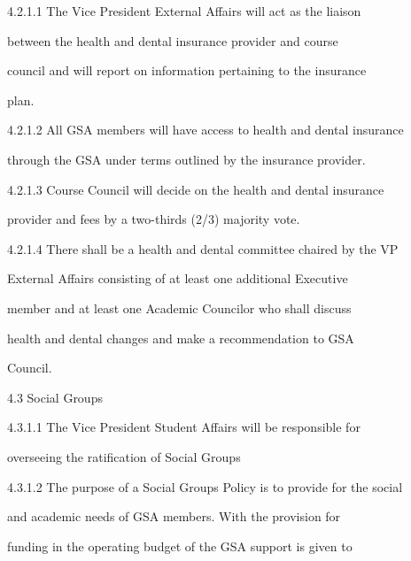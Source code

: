   4.2.1.1      The   Vice   President   External   Affairs   will   act   as   the   liaison  

               between  the  health  and  dental  insurance  provider  and  course  

               council and will report on information pertaining to the insurance  

               plan.   



  4.2.1.2      All GSA members will have access to health and dental insurance  

               through the GSA under terms outlined by the insurance provider.   



  4.2.1.3      Course  Council  will  decide  on  the  health  and  dental  insurance  

               provider and fees by a two-thirds (2/3) majority vote.   



  4.2.1.4      There shall be a health and dental committee chaired by the VP  

               External  Affairs  consisting  of  at  least  one  additional  Executive  

               member and at least one Academic Councilor who shall discuss  

               health  and  dental  changes  and  make  a  recommendation  to  GSA  

               Council.   



  



                                   4.3     Social Groups  



  



  4.3.1.1      The   Vice   President   Student   Affairs   will   be   responsible   for  

               overseeing the ratification of Social Groups  



  4.3.1.2      The purpose of a Social Groups Policy is to provide for the social  

               and  academic  needs  of  GSA  members.  With  the  provision  for  

               funding  in the  operating  budget  of  the  GSA  support  is  given  to  

